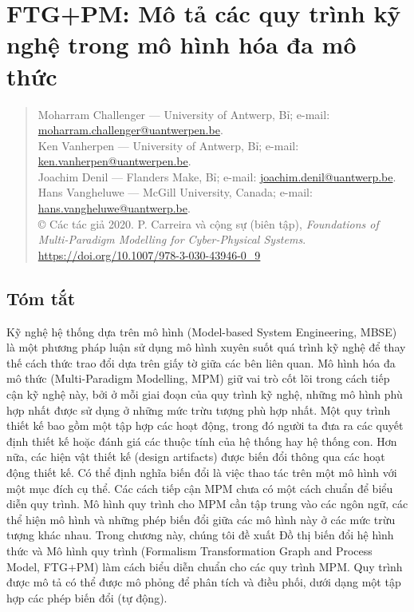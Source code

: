 \chapter{FTG+PM: Mô tả các quy trình kỹ nghệ trong mô hình hóa đa mô thức}

\begin{quote}\small
Moharram Challenger --- University of Antwerp, Bỉ; e-mail: \url{moharram.challenger@uantwerpen.be}.\\
Ken Vanherpen --- University of Antwerp, Bỉ; e-mail: \url{ken.vanherpen@uantwerpen.be}.\\
Joachim Denil --- Flanders Make, Bỉ; e-mail: \url{joachim.denil@uantwerp.be}.\\
Hans Vangheluwe --- McGill University, Canada; e-mail: \url{hans.vangheluwe@uantwerp.be}.\\
© Các tác giả 2020. P. Carreira và cộng sự (biên tập), \emph{Foundations of Multi-Paradigm Modelling for Cyber-Physical Systems}.\\
\url{https://doi.org/10.1007/978-3-030-43946-0_9}
\end{quote}

\section*{Tóm tắt}
Kỹ nghệ hệ thống dựa trên mô hình (Model-based System Engineering, MBSE) là một phương pháp luận sử dụng mô hình xuyên suốt quá trình kỹ nghệ để thay thế cách thức trao đổi dựa trên giấy tờ giữa các bên liên quan. Mô hình hóa đa mô thức (Multi-Paradigm Modelling, MPM) giữ vai trò cốt lõi trong cách tiếp cận kỹ nghệ này, bởi ở mỗi giai đoạn của quy trình kỹ nghệ, những mô hình phù hợp nhất được sử dụng ở những mức trừu tượng phù hợp nhất. Một quy trình thiết kế bao gồm một tập hợp các hoạt động, trong đó người ta đưa ra các quyết định thiết kế hoặc đánh giá các thuộc tính của hệ thống hay hệ thống con. Hơn nữa, các hiện vật thiết kế (design artifacts) được biến đổi thông qua các hoạt động thiết kế. Có thể định nghĩa biến đổi là việc thao tác trên một mô hình với một mục đích cụ thể. Các cách tiếp cận MPM chưa có một cách chuẩn để biểu diễn quy trình. Mô hình quy trình cho MPM cần tập trung vào các ngôn ngữ, các thể hiện mô hình và những phép biến đổi giữa các mô hình này ở các mức trừu tượng khác nhau. Trong chương này, chúng tôi đề xuất Đồ thị biến đổi hệ hình thức và Mô hình quy trình (Formalism Transformation Graph and Process Model, FTG+PM) làm cách biểu diễn chuẩn cho các quy trình MPM. Quy trình được mô tả có thể được mô phỏng để phân tích và điều phối, dưới dạng một tập hợp các phép biến đổi (tự động).

